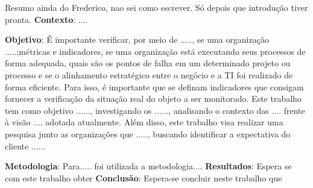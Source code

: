 Resumo ainda do Frederico, nao sei como escrever. Só depois que introdução tiver pronta.
\textbf{Contexto}: ....

\textbf{Objetivo}: É importante verificar, por meio de ....., se  uma organização .....;métricas e indicadores, se uma organização está executando seus processos de forma adequada, quais são os pontos de falha em um determinado projeto ou processo e se o alinhamento estratégico entre o negócio e a TI foi realizado de forma eficiente. Para isso, é importante que se definam indicadores que consigam fornecer a verificação da situação real do objeto a ser monitorado. Este trabalho tem como objetivo ......, investigando os ......, analisando o contexto das .... frente à visão .... adotada atualmente. Além disso, este trabalho visa realizar uma pesquisa junto as organizações que ....., buscando identificar a expectativa do cliente ...... 

\textbf{Metodologia}: Para..... foi utilizada a metodologia.... \textbf{Resultados}: Espera se com este trabalho obter  \textbf{Conclusão}: Espera-se concluir neste trabalho que 